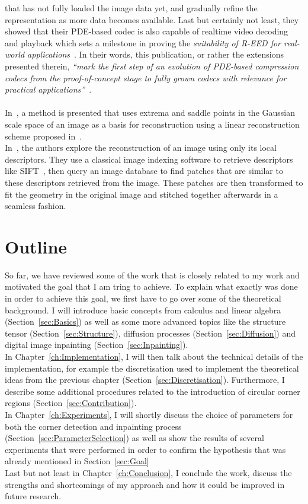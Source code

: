 that has not fully loaded the image data yet, and gradually refine the representation as more data
becomes available. Last but certainly not least, they showed that their PDE-based codec is also
capable of realtime video decoding and playback which sets a milestone in proving the
\textit{suitability of R-EED for real-world applications}~\cite{peter15}. In their words, this
publication, or rather the extensions presented therein, \textit{\enquote{mark the first step of an evolution of
PDE-based compression codecs from the proof-of-concept stage to fully grown codecs with relevance
for practical applications}}~\cite{peter15}.\\
\\
In~\cite{kanters05}, a method is presented that uses extrema and saddle points in the Gaussian
scale space of an image as a basis for reconstruction using a linear reconstruction scheme proposed
in~\cite{janssen05}.\\
In~\cite{weinzaepfel11}, the authors explore the reconstruction of an image using only its local
descriptors. They use a classical image indexing software to retrieve descriptors like
SIFT~\cite{sift}, then query an image database to find patches that are similar to these descriptors
retrieved from the image. These patches are then transformed to fit the geometry in the original
image and stitched together afterwards in a seamless fashion.
\newpage\noindent
\section{Outline}
So far, we have reviewed some of the work that is closely related to my work and 
motivated the goal that I am tring to achieve.
To explain what exactly was done in order to achieve this goal, we first have to go over some of the
theoretical background. I will introduce basic concepts from
calculus and linear algebra (Section~\ref{sec:Basics}) as well as some more advanced topics
like the structure tensor (Section~\ref{sec:Structure}), diffusion processes (Section~\ref{sec:Diffusion}) and
digital image inpainting (Section~\ref{sec:Inpainting}).\\
In Chapter~\ref{ch:Implementation}, I will then talk about the technical details of the  
implementation, for example the discretisation used to implement the theoretical ideas from 
the previous chapter (Section~\ref{sec:Discretisation}). Furthermore, I describe some additional procedures
related to the introduction of circular corner regions (Section~\ref{sec:Contribution}).\\
In Chapter~\ref{ch:Experiments}, I will shortly discuss the choice of parameters for both the
corner detection and inpainting process (Section~\ref{sec:ParameterSelection}) as well as show 
the results of several experiments that were performed in order to confirm the hypothesis that was
already mentioned in Section~\ref{sec:Goal} \\
Last but not least in Chapter~\ref{ch:Conclusion}, I conclude the work, discuss the strengths
and shortcomings of my approach and how it could be improved in future research.
